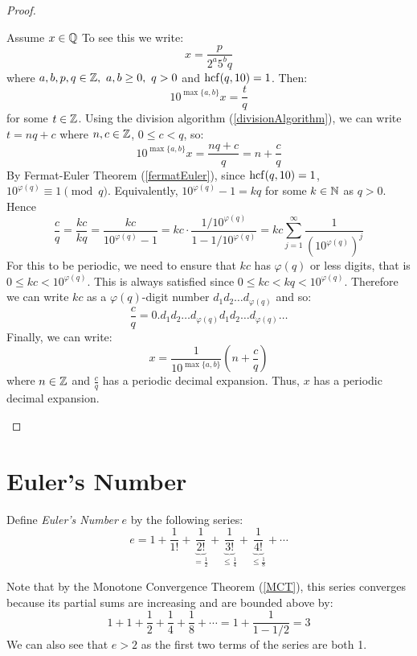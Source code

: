 \documentclass[../main.tex]{subfiles}
\begin{document}
\begin{proof}
  \begin{proofdirection}{Assume $x \in \mathbb{Q}$}
    To see this we write:
    \[
      x = \frac{p}{2^{a}5^{b} q}
    \]
    where $a, b, p, q \in \mathbb{Z},\ a, b \geq 0,\ q > 0$ and $\operatorname{hcf}(q, 10) = 1$.
    Then:
    \[
      10^{\max\{a, b\}}x = \frac{t}{q}
    \]
    for some $t \in \mathbb{Z}$.
    Using the division algorithm (\cref{divisionAlgorithm}), we can write $t = nq + c$ where $n, c \in \mathbb{Z}$, $0 \leq c < q$, so:
    \[
      10^{\max\{a, b\}}x = \frac{nq + c}{q} = n + \frac{c}{q}
    \]
    By Fermat-Euler Theorem (\cref{fermatEuler}), since $\operatorname{hcf}(q, 10) = 1$, $10^{\varphi(q)} \equiv 1 \pmod{q}$.
    Equivalently, $10^{\varphi(q)} - 1 = kq$ for some $k \in \mathbb{N}$ as $q > 0$.
    Hence
    \[
      \frac{c}{q} = \frac{kc}{kq} = \frac{kc}{10^{\varphi(q)} - 1}= kc \cdot \frac{1/10^{\varphi(q)}}{1 - 1/10^{\varphi(q)}} = kc \sum_{j = 1}^{\infty} \frac{1}{(10^{\varphi(q)})^{j}}
    \]
    For this to be periodic, we need to ensure that $kc$ has $\varphi(q)$ or less digits, that is $0 \leq kc < 10^{\varphi(q)}$.
    This is always satisfied since $0 \leq kc < kq < 10^{\varphi(q)}$.
    Therefore we can write $kc$ as a $\varphi(q)$-digit number $d_1d_2\ldots d_{\varphi(q)}$ and so:
    \[
      \frac{c}{q} = 0.d_1d_2\ldots d_{\varphi(q)}d_1d_2\ldots d_{\varphi(q)}\ldots
    \]
    Finally, we can write:
    \[
      x = \frac{1}{10^{\max\{a, b\}}}\left(n + \frac{c}{q}\right)
    \]
    where $n \in \mathbb{Z}$ and $\frac{c}{q}$ has a periodic decimal expansion.
    Thus, $x$ has a periodic decimal expansion.
  \end{proofdirection}
\end{proof}
\section{Euler's Number}
\begin{definition}
Define \textit{Euler's Number} $e$ by the following series:
\[
  e = 1 + \frac{1}{1!} + \underbrace{\frac{1}{2!}}_{= \frac{1}{2}} + \underbrace{\frac{1}{3!}}_{\leq \frac{1}{4}} + \underbrace{\frac{1}{4!}}_{\leq \frac{1}{8}} + \cdots
\]
\end{definition}
Note that by the Monotone Convergence Theorem (\cref{MCT}), this series converges because its partial sums are increasing and are bounded above by:
\[
  1 + 1 + \frac{1}{2} + \frac{1}{4} + \frac{1}{8} + \cdots = 1 + \frac{1}{1-1/2} = 3
\]
We can also see that $e > 2$ as the first two terms of the series are both 1.
\end{document}
